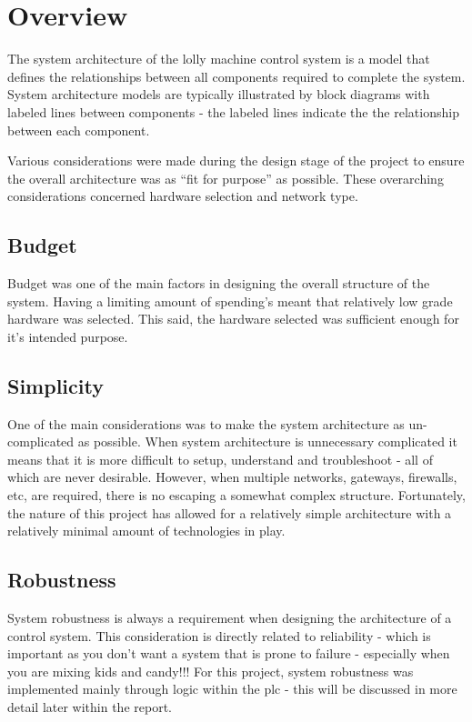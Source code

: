 \section{Overview}
    The system architecture of the lolly machine control system is a model that defines the relationships between all  components required to complete the system. System architecture models are typically illustrated by block diagrams with labeled lines between components - the labeled lines indicate the the relationship between each component. 

    Various considerations were made during the design stage of the project to ensure the overall architecture was as “fit for purpose” as possible. These overarching considerations concerned hardware selection and network type.

    \subsection{Budget}
        Budget was one of the main factors in designing the overall structure of the system. Having a limiting amount of spending's meant that relatively low grade hardware was selected. This said, the hardware selected was sufficient enough for it’s intended purpose.

    \subsection{Simplicity}
        One of the main considerations was to make the system architecture as un-complicated as possible. When system architecture is unnecessary complicated it means that it is more difficult to setup, understand and troubleshoot - all of which are never desirable. However, when multiple networks, gateways, firewalls, etc, are required, there is no escaping a somewhat complex structure. Fortunately, the nature of this project has allowed for a relatively simple architecture with a relatively minimal amount of technologies in play.
    
    \subsection{Robustness}
        System robustness is always a requirement when designing the architecture of a control system. This consideration is directly related to reliability - which is important as you don’t want a system that is prone to failure - especially when you are mixing kids and candy!!! For this project, system robustness was implemented mainly through logic within the \acrshort{plc} - this will be discussed in more detail later within the report. 
    
